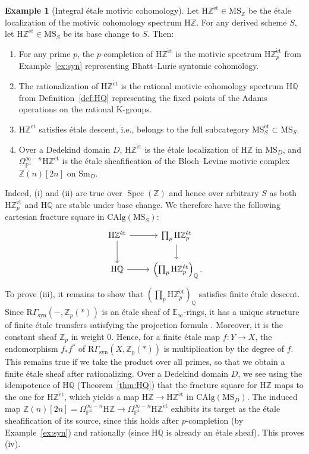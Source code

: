 \documentclass{amsart}
\numberwithin{equation}{section}
\theoremstyle{plain}
\theoremstyle{definition}
\newtheorem{example}[equation]{Example}
\let\bb=\mathbb
\def\Z{\bb Z}
\def\Q{\bb Q}
\def\P{\bb P}
\def\ph{\mathord-}
\DeclareMathOperator{\Spec}{Spec}
\def\HH{\mathrm{H}}
\def\E{\mathbb{E}}
\def\et{\mathrm{\acute et}}
\let\cat=\mathrm
\def\Sm{{\cat{S}\mathrm{m}}}
\def\MS{\mathrm{MS}}
\def\CAlg{\mathrm{CAlg}{}}
\newcommand{\syn}{\mathrm{syn}}
\begin{document}
\begin{example}[Integral étale motivic cohomology]
	\label{ex:HZetale}
	Let $\HH\Z^\et\in \MS_\Z$ be the étale localization of the motivic cohomology spectrum $\HH\Z$. For any derived scheme $S$, let $\HH\Z^\et\in \MS_S$ be its base change to $S$. Then:
	\begin{enumerate}
		\item For any prime $p$, the $p$-completion of $\HH\Z^\et$ is the motivic spectrum $\HH\Z_p^\et$ from Example~\ref{ex:syn} representing Bhatt–Lurie syntomic cohomology.
		\item The rationalization of $\HH\Z^\et$ is the rational motivic cohomology spectrum $\HH\Q$ from Definition~\ref{def:HQ} representing the fixed points of the Adams operations on the rational K-groups.
		\item $\HH\Z^\et$ satisfies étale descent, i.e., belongs to the full subcategory $\MS_S^\et\subset\MS_S$.
		\item Over a Dedekind domain $D$, $\HH\Z^\et$ is the étale localization of $\HH\Z$ in $\MS_D$, and $\Omega^{\infty-n}_{\P^1}\HH\Z^\et$ is the étale sheafification of the Bloch–Levine motivic complex $\Z(n)[2n]$ on $\Sm_D$.
	\end{enumerate}
	Indeed, (i) and (ii) are true over $\Spec(\Z)$ and hence over arbitrary $S$ as both $\HH\Z_p^\et$ and $\HH\Q$ are stable under base change. 
	We therefore have the following cartesian fracture square in $\CAlg(\MS_S)$:
	\[
	\begin{tikzcd}
		\HH\Z^\et \ar{r} \ar{d} & \prod_p \HH\Z_p^\et \ar{d} \\
		\HH\Q \ar{r} & \left(\prod_p\HH\Z_p^\et\right)_\Q\rlap.
	\end{tikzcd}
	\]
	To prove (iii), it remains to show that $(\prod_p\HH\Z_p^\et)_\Q$ satisfies finite étale descent.
	Since $\mathrm{R}\Gamma_\syn(\ph,\Z_p(*))$ is an étale sheaf of $\E_\infty$-rings, it has a unique structure of finite étale transfers satisfying the projection formula \cite[Corollary C.13]{norms}. Moreover, it is the constant sheaf $\Z_p$ in weight $0$. Hence, for a finite étale map $f\colon Y\to X$, the endomorphism $f_*f^*$ of $\mathrm{R}\Gamma_\syn(X,\Z_p(*))$ is multiplication by the degree of $f$. This remains true if we take the product over all primes, so that we obtain a finite étale sheaf after rationalizing.
	Over a Dedekind domain $D$, we see using the idempotence of $\HH\Q$ (Theorem~\ref{thm:HQ}) that the fracture square for $\HH\Z$ maps to the one for $\HH\Z^\et$, which yields a map $\HH\Z\to \HH\Z^\et$ in $\CAlg(\MS_D)$. The induced map $\Z(n)[2n]=\Omega_{\P^1}^{\infty-n}\HH\Z\to \Omega_{\P^1}^{\infty-n}\HH\Z^\et$ exhibits its target as the étale sheafification of its source, since this holds after $p$-completion (by Example~\ref{ex:syn}) and rationally (since $\HH\Q$ is already an étale sheaf). This proves (iv).
\end{example}
\end{document}
